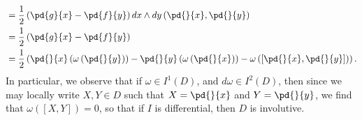 \documentclass[10pt]{mypackage}
\begin{document}
\begin{solution}
\begin{enumerate}[(a)]
\begin{align*}
                                  &= \frac{1}{2} \left( \pd{g}{x} - \pd{f}{y} \right) dx\wedge dy\left( \pd{}{x},\pd{}{y} \right)\\
                                  &= \frac{1}{2}\left( \pd{g}{x} - \pd{f}{y} \right)\\
                                  &= \frac{1}{2}\left( \pd{}{x}\left(\omega\left( \pd{}{y} \right)\right) - \pd{}{y}\left( \omega\left( \pd{}{x} \right) \right) - \omega\left( \left[ \pd{}{x},\pd{}{y} \right] \right) \right).
      \end{align*}
      In particular, we observe that if $\omega\in I^{1}\left( D \right)$, and $d\omega\in I^{2}\left( D \right)$, then since we may locally write $X,Y\in D$ such that $ X = \pd{}{x} $ and $ Y = \pd{}{y} $, we find that $ \omega\left( \left[ X,Y \right] \right) = 0 $, so that if $I$ is differential, then $D$ is involutive.
  \end{enumerate}
\end{solution}
\end{document}
